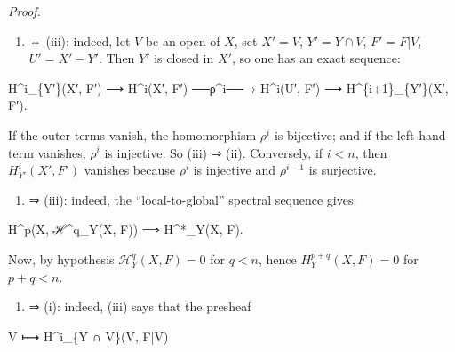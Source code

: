 \documentclass[
]{article}
\newenvironment{Shaded}{}{}
\newcommand{\NormalTok}[1]{#1}
\providecommand{\tightlist}{%
  \setlength{\itemsep}{0pt}\setlength{\parskip}{0pt}}
\begin{document}
\emph{Proof.}

\begin{enumerate}
\def\labelenumi{(\roman{enumi})}
\setcounter{enumi}{1}
\tightlist
\item
  ⇔ (iii): indeed, let \(V\) be an open of \(X\), set \(X' = V\),
  \(Y' = Y \cap V\), \(F' = F|V\), \(U' = X' - Y'\). Then \(Y'\) is
  closed in \(X'\), so one has an exact sequence:
\end{enumerate}

\begin{Shaded}
\begin{Highlighting}[]
\NormalTok{H\^{}i\_\{Y′\}(X′, F′) ⟶ H\^{}i(X′, F′) ──ρ\^{}i──→ H\^{}i(U′, F′) ⟶ H\^{}\{i+1\}\_\{Y′\}(X′, F′).}
\end{Highlighting}
\end{Shaded}

If the outer terms vanish, the homomorphism \(\rho^{i}\) is bijective;
and if the left-hand term vanishes, \(\rho^{i}\) is injective. So (iii)
⇒ (ii). Conversely, if \(i < n\), then \(H^{i}_{Y'}(X', F')\) vanishes
because \(\rho^{i}\) is injective and \(\rho^{i-1}\) is surjective.

\begin{enumerate}
\def\labelenumi{(\roman{enumi})}
\tightlist
\item
  ⇒ (iii): indeed, the ``local-to-global'' spectral sequence gives:
\end{enumerate}

\begin{Shaded}
\begin{Highlighting}[]
\NormalTok{H\^{}p(X, ℋ\^{}q\_Y(X, F)) ⟹ H\^{}*\_Y(X, F).}
\end{Highlighting}
\end{Shaded}

Now, by hypothesis \(\mathcal{H}^{q}_{Y}(X, F) = 0\) for \(q < n\),
hence \(H^{p+q}_{Y}(X, F) = 0\) for \(p + q < n\).

\begin{enumerate}
\def\labelenumi{(\roman{enumi})}
\setcounter{enumi}{2}
\tightlist
\item
  ⇒ (i): indeed, (iii) says that the presheaf
\end{enumerate}

\begin{Shaded}
\begin{Highlighting}[]
\NormalTok{V ⟼ H\^{}i\_\{Y ∩ V\}(V, F|V)}
\end{Highlighting}
\end{Shaded}
\end{document}
